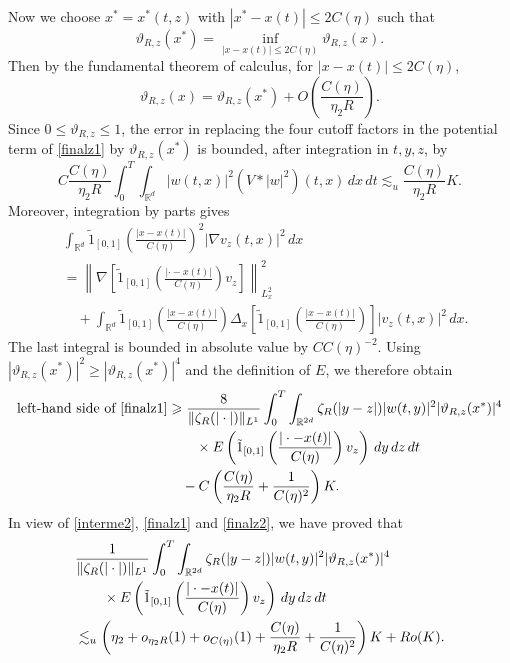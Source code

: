\documentclass[reqno,11pt]{amsart}
\theoremstyle{plain}
\theoremstyle{definition}
\numberwithin{equation}{section}
\numberwithin{theorem}{section}
\def\geq{\geqslant}
\def\leq{\leqslant}
\def\R{\mathbb{R}}
\begin{document}
Now we choose $x^{\ast}=x^{\ast}(t,z)$ with $|x^{\ast}-x(t)|\leq2C(\eta)$ such that
\[
 \vartheta_{R,z}(x^{\ast})
 =\inf_{|x-x(t)|\leq2C(\eta)}\vartheta_{R,z}(x).
\]
Then by the fundamental theorem of calculus, for $|x-x(t)|\leq2C(\eta)$,
\[
 \vartheta_{R,z}(x)=\vartheta_{R,z}(x^{\ast})
 +O\left(\frac{C(\eta)}{\eta_2R}\right).
\]
Since $0\leq\vartheta_{R,z}\leq1$, the error in replacing the four cutoff
factors in the potential term of \eqref{finalz1} by
$\vartheta_{R,z}(x^{\ast})$ is bounded, after integration in $t,y,z$, by
\[
 C\frac{C(\eta)}{\eta_2R}
 \int_0^T\int_{\R^d}|w(t,x)|^2(V*|w|^2)(t,x)\,dx\,dt
 \lesssim_u\frac{C(\eta)}{\eta_2R}K.
\]
Moreover, integration by parts gives
\begin{align*}
 &\int_{\R^d}\tilde{1}_{[0,1]}
       \left(\frac{|x-x(t)|}{C(\eta)}\right)^2|\nabla v_z(t,x)|^2\,dx\\
 &=\left\|\nabla\left[\tilde{1}_{[0,1]}
       \left(\frac{|\cdot-x(t)|}{C(\eta)}\right)v_z\right]\right\|_{L_x^2}^2\\
 &\quad+\int_{\R^d}\tilde{1}_{[0,1]}
       \left(\frac{|x-x(t)|}{C(\eta)}\right)
       \Delta_x\left[\tilde{1}_{[0,1]}
       \left(\frac{|x-x(t)|}{C(\eta)}\right)\right]|v_z(t,x)|^2\,dx.
\end{align*}
The last integral is bounded in absolute value by $CC(\eta)^{-2}$.
Using $|\vartheta_{R,z}(x^{\ast})|^2\geq|\vartheta_{R,z}(x^{\ast})|^4$
and the definition of $E$, we therefore obtain
\begin{align}\label{finalz2}
 \text{left-hand side of }\eqref{finalz1}
 &\geq\frac8{\|\zeta_R(|\cdot|)\|_{L^1}}
 \int_0^T\int_{\R^{2d}}\zeta_R(|y-z|)|w(t,y)|^2
 |\vartheta_{R,z}(x^{\ast})|^4\notag\\
 &\qquad\times E\left(\tilde{1}_{[0,1]}
       \left(\frac{|\cdot-x(t)|}{C(\eta)}\right)v_z\right)\,dy\,dz\,dt\notag\\
 &\quad-C\left(\frac{C(\eta)}{\eta_2R}
                         +\frac1{C(\eta)^2}\right)K.
\end{align}
In view of \eqref{interme2}, \eqref{finalz1} and \eqref{finalz2}, we have proved that
\begin{align}\label{mmmn}
 &\frac1{\|\zeta_R(|\cdot|)\|_{L^1}}
 \int_0^T\int_{\R^{2d}}\zeta_R(|y-z|)|w(t,y)|^2
 |\vartheta_{R,z}(x^{\ast})|^4\notag\\
 &\qquad\times E\left(\tilde{1}_{[0,1]}
       \left(\frac{|\cdot-x(t)|}{C(\eta)}\right)v_z\right)\,dy\,dz\,dt\notag\\
 &\lesssim_u\left(\eta_2+o_{\eta_2R}(1)+o_{C(\eta)}(1)
       +\frac{C(\eta)}{\eta_2R}+\frac1{C(\eta)^2}\right)K+Ro(K).
\end{align}
\end{document}
